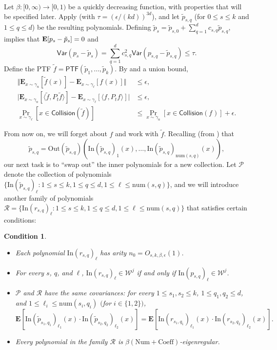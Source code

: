 \documentclass{toc}
\newcommand{\E}{{\bf E}}
\newcommand{\Inner}{\mathrm{In}}
\newcommand{\Outer}{\mathrm{Out}}
\newcommand{\num}{\mathrm{num}}
\newtheorem{cond}[theorem]{Condition}
\begin{document}
Let $\beta: [0, \infty) \to [0, 1)$ be a quickly decreasing function, with
properties that will be specified later. Apply 
(with $\tau = (\epsilon / (kd))^{3d}$), and let $\tilde p_{s,q}$ (for $0 \le s \le k$ and $1 \le q \le d$) be the resulting polynomials. Defining $\tilde p_s = \tilde p_{s,0} + \sum_{q=1}^d c_{s,q} \tilde p_{s,q}$,  implies that $\E[p_s - \tilde p_s] = 0$ and
\[
\mathsf{Var}(p_s - \tilde{p}_s) = \sum_{q=1}^d c_{s,q}^2 \mathsf{Var}(p_{s,q} - \tilde{p}_{s,q})  \le \tau. 
\]
Define the PTF $\tilde{f} = \mathsf{PTF}(\tilde{p}_1, \ldots, \tilde{p}_k)$. By
 and a union bound, 
\begin{align*}
\Vert \mathbf{E}_{x \sim \gamma_n} [\tilde{f}(x) ] - \mathbf{E}_{x \sim \gamma_\ell} [f_{}(x)  ] \Vert&\le\epsilon,  \\
\big| \mathbf{E}_{x \sim \gamma_n} [ \langle \tilde{f}, P_t  \tilde{f} \rangle ] - \mathbf{E}_{x \sim \gamma_{\ell}} [\langle f_{}, P_t f_{}\rangle ] \big| &\le \epsilon, \\ 
\Pr_{x \sim \gamma_{\ell}} [x \in \mathsf{Collision}(\tilde{f})] &\le \Pr_{x \sim \gamma_{n}} [x \in \mathsf{Collision}(f_{})] + \epsilon.
\end{align*}

{}From now on, we will forget about $f$ and work with $\tilde{f}$. Recalling (from ) that
$$
\tilde{p}_{s,q} = \Outer(\tilde p_{s,q})\left(
\Inner(\tilde p_{s,q})_1(x),\dots, \Inner(\tilde p_{s,q})_{\num({s,q})}(x)\right),
$$
our next task is to ``swap out'' the inner polynomials for a new collection.
Let $\mathcal{P}$ denote the collection of polynomials
$\{\Inner(\tilde p_{s,q})_\ell: 1 \le s \le k, 1 \le q \le d, 1 \le \ell \le \num(s,q)\}$, and
we will introduce another family of polynomials $\mathcal{R} =
\{\Inner(r_{s,q})_\ell: 1 \le s \le k, 1 \le q \le d, 1 \le \ell \le \num(s,q)\}$
that satisfies certain conditions:
\begin{cond}\label{cond:junta} $ $
\begin{itemize}
    \item Each polynomial $\Inner(r_{s,q})_\ell$ has arity $n_0 = O_{s,k,\beta,\epsilon}(1)$.
\item For every $s$, $q$, and $\ell$, $\Inner(r_{s,q})_\ell \in \mathcal{W}^j$ if and only if $\Inner(p_{s,q})_\ell \in \mathcal{W}^j$.
\item $\mathcal{P}$ and $\mathcal{R}$ have the same covariances:
    for every $1 \le s_1, s_2 \le k$, $1 \le q_1, q_2 \le d$, and $1 \le \ell_i \leq \num(s_i, q_i)$ $($for $i \in \{1,2\})$, 
\[
\mathbf{E}[\Inner(\tilde p_{s_1,q_1})_{\ell_1}(x) \cdot \Inner(\tilde p_{s_2,q_2})_{\ell_2}(x) ] = \mathbf{E}[\Inner(r_{s_1,q_1})_{\ell_1}(x) \cdot \Inner(r_{s_2,q_2})_{\ell_2}(x) ].
\]
\item Every polynomial in the family $\mathcal{R}$ is $\beta(\mathrm{Num} + \mathrm{Coeff})$-eigenregular. 
\end{itemize}
\end{cond}
\end{document}
